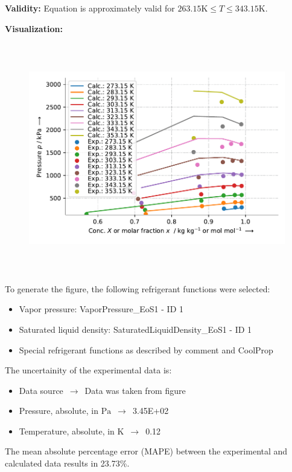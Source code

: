 \textbf{Validity:}
\newline
Equation is approximately valid for $263.15 \si{\kelvin} \leq T \leq 343.15 \si{\kelvin}$.
\newline

\textbf{Visualization:}
%
\begin{figure}[!htp]
{\noindent\includegraphics[height=10cm, keepaspectratio]{figs/abs/abs_R-134a_lubricant_PAG_TsubokaKatayama_1.pdf}}
\end{figure}
%

To generate the figure, the following refrigerant functions were selected:
\begin{itemize}
\item Vapor pressure: VaporPressure\_EoS1 - ID 1
\item Saturated liquid density: SaturatedLiquidDensity\_EoS1 - ID 1
\item Special refrigerant functions as described by comment and CoolProp
\end{itemize}

The uncertainity of the experimental data is:
\begin{itemize}
\item Data source $\,\to\,$ Data was taken from figure
\item Pressure, absolute, in $\si{\pascal}$ $\,\to\,$ 3.45E+02
\item Temperature, absolute, in $\si{\kelvin}$ $\,\to\,$ 0.12
\end{itemize}

The mean absolute percentage error (MAPE) between the experimental and calculated data results in 23.73\%.
\FloatBarrier
\newpage
